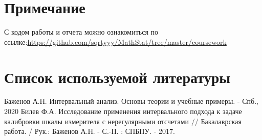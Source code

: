 \documentclass[a4paper]{article}
\begin{document}
    \section{Примечание}
        С кодом работы и отчета можно ознакомиться по ссылке:\;\url{https://github.com/sqrtyyy/MathStat/tree/master/coursework}

\section{Список используемой литературы}
    \begin{thebibliography}{3}
        Баженов А.Н. Интервальный анализ. Основы теории и учебные примеры. - Спб., 2020
        Билев Ф.А. Исследование применения интервального подхода к задаче калибровки шкалы измерителя с нерегулярными отсчетами // Бакалаврская работа. / Рук.: Баженов А.Н. - С.-П. : СПБПУ. - 2017.
    \end{thebibliography}
\end{document}
